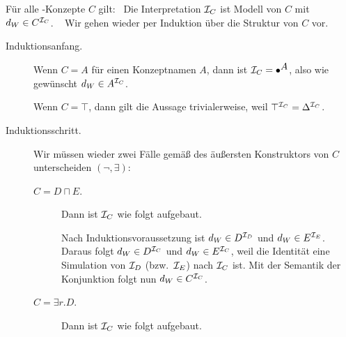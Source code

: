 \documentclass[fontsize=11pt, twoside=false, numbers=autoenddot]{scrbook}
\begin{document}
F\"ur alle \EL-Konzepte $C$ gilt:~
Die Interpretation $\mathcal{I}_C$ ist Modell von $C$ mit 
$d_W \in C^{\mathcal{I}_C}$.
%
\parII
{}~
Wir gehen wieder per Induktion über die Struktur von $C$ vor.
%
  \begin{description}
    \item[Induktionsanfang.]
      Wenn $C=A$ für einen Konzeptnamen $A$,
      dann ist $\mathcal{I}_C = \bullet^{\text{{\normalsize $A$}}}$,
      also wie gewünscht $d_W \in A^{\mathcal{I}_C}$.
      
      Wenn $C=\top$, dann gilt die Aussage trivialerweise, weil $\top^{\mathcal{I}_C} = \Delta^{\mathcal{I}_C}$.
    \item[Induktionsschritt.]
      Wir müssen wieder zwei Fälle gemäß des äußersten Konstruktors
      von $C$ unterscheiden $(\lnot,\exists)$:
      \goodbreak
      \begin{description}
        \item[{\boldmath $C=D \sqcap E$.}]
          Dann ist $\mathcal{I}_C$ wie folgt aufgebaut.
          \begin{center}
          \end{center}
          \parI
          Nach Induktionsvoraussetzung ist $d_W \in D^{\mathcal{I}_D}$ und $d_W \in E^{\mathcal{I}_E}$.
          Daraus folgt $d_W \in D^{\mathcal{I}_C}$ und $d_W \in E^{\mathcal{I}_C}$,
          weil die Identität eine Simulation von $\mathcal{I}_D$ (bzw.\ $\mathcal{I}_E$) nach $\mathcal{I}_C$ ist.
          Mit der Semantik der Konjunktion folgt nun $d_W \in C^{\mathcal{I}_C}$.
          \parI
        \item[{\boldmath $C=\exists r.D$.}]
          Dann ist $\mathcal{I}_C$ wie folgt aufgebaut.
          \begin{center}
\end{center}
\end{description}
\end{description}
\end{document}
